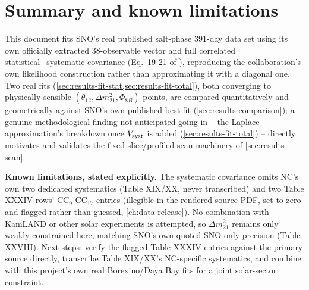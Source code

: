 \section{Summary and known limitations}

This document fits SNO's real published salt-phase 391-day data set using
its own officially extracted 38-observable vector and full correlated
statistical+systematic covariance (Eq.~19-21 of
\cite{Aharmim2005SaltPhase}), reproducing the collaboration's own
likelihood construction rather than approximating it with a diagonal one.
Two real fits (\cref{sec:results-fit-stat,sec:results-fit-total}), both
converging to physically sensible $(\theta_{12},\Delta m^2_{21},\Phi_{8B})$
points, are compared quantitatively and geometrically against SNO's own
published best fit (\cref{sec:results-comparison}); a genuine
methodological finding not anticipated going in -- the Laplace
approximation's breakdown once $V_{\rm syst}$ is added
(\cref{sec:results-fit-total}) -- directly motivates and validates the
fixed-slice/profiled scan machinery of \cref{sec:results-scan}.

\begin{notebox}
\textbf{Known limitations, stated explicitly.} The systematic covariance
omits NC's own two dedicated systematics (Table XIX/XX, never
transcribed) and two Table XXXIV rows' CC$_9$-CC$_{17}$ entries
(illegible in the rendered source PDF, set to zero and flagged rather than
guessed, \cref{ch:data-release}). No combination with KamLAND or other
solar experiments is attempted, so $\Delta m^2_{21}$ remains only weakly
constrained here, matching SNO's own quoted SNO-only precision (Table
XXVIII). Next steps: verify the flagged Table XXXIV entries against the
primary source directly, transcribe Table XIX/XX's NC-specific
systematics, and combine with this project's own real Borexino/Daya Bay
fits for a joint solar-sector constraint.
\end{notebox}
